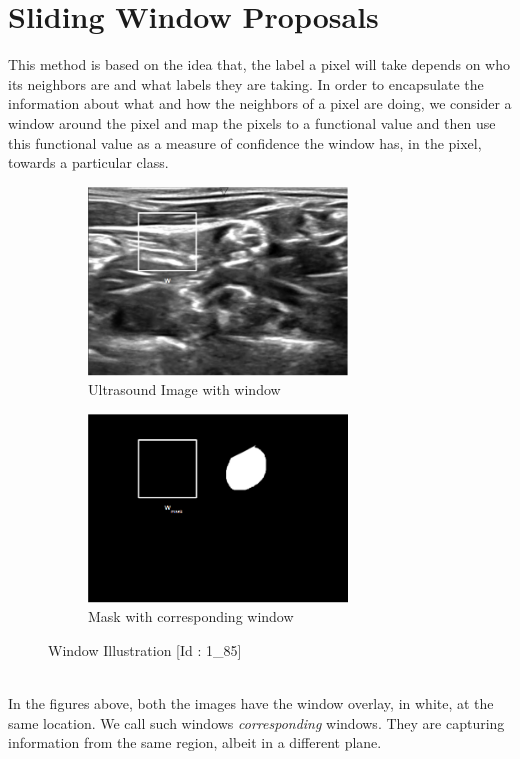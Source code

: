 \documentclass[12pt, a4paper]{article}
\begin{document}
\section{Sliding Window Proposals}
This method is based on the idea that, the label a pixel will take depends on who its neighbors are and what labels they are taking. In order to encapsulate the information about what and how the neighbors of a pixel are doing, we consider a window around the pixel and map the pixels to a functional value and then use this functional value as a measure of confidence the window has, in the pixel, towards a particular class.
\begin{figure}[h] 
\begin{subfigure}{0.5\textwidth}
\includegraphics[width=\linewidth, height=5cm]{Selection_001.png} 
\caption{Ultrasound Image with window}
\label{fig:ultrasoundimagewithwindow}
\end{subfigure}
\begin{subfigure}{0.5\textwidth}
\includegraphics[width=\linewidth, height=5cm]{Selection_002.png}
\caption{Mask with corresponding window }
\label{fig:humanannotationwithwindow}
\end{subfigure}
\caption{Window Illustration [Id : 1\_85]}
\label{fig:dataimage2}
\end{figure}
\\
In the figures above, both the images have the window overlay, in white, at the same location. We call such windows \emph{corresponding} windows. They are capturing information from the same region, albeit in a different plane.
\end{document}
